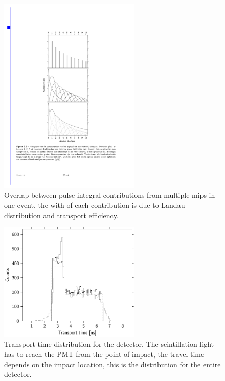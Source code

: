 \begin{figure}
    \centering
    \includegraphics[width=0.6\textwidth]
                    {plots/experiment/ph_histogram_contrib}
    \caption{Overlap between pulse integral contributions from multiple mips in one event, the with of each contribution is due to Landau distribution and transport efficiency.}
    \label{fig:ph_histogram_contrib}
\end{figure}


\begin{figure}
    \centering
    \includegraphics[width=0.6\textwidth]
                    {plots/experiment/transport_time}
    \caption{Transport time distribution for the detector. The scintillation light has to reach the PMT from the point of impact, the travel time depends on the impact location, this is the distribution for the entire detector.}
    \label{fig:transport_time}
\end{figure}


